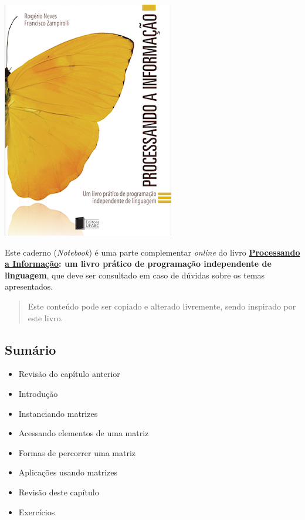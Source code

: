 \documentclass[12pt,a4paper]{article}
\providecommand{\tightlist}{%
      \setlength{\itemsep}{0pt}\setlength{\parskip}{0pt}}
\begin{document}
    \includegraphics{"figs/Capa_Processando_Informacao.jpg"}

Este caderno (\emph{Notebook}) é uma parte complementar \emph{online} do
livro
\textbf{\href{https://editora.ufabc.edu.br/matematica-e-ciencias-da-computacao/58-processando-a-informacao}{Processando
a Informação}: um livro prático de programação independente de
linguagem}, que deve ser consultado em caso de dúvidas sobre os temas
apresentados.

\begin{quote}
Este conteúdo pode ser copiado e alterado livremente, sendo inspirado
por este livro.
\end{quote}

    \hypertarget{sumuxe1rio}{%
\subsection{Sumário}\label{sumuxe1rio}}

\begin{itemize}
\tightlist
\item
  Revisão do capítulo anterior
\item
  Introdução
\item
  Instanciando matrizes
\item
  Acessando elementos de uma matriz
\item
  Formas de percorrer uma matriz
\item
  Aplicações usando matrizes
\item
  Revisão deste capítulo
\item
  Exercícios
\end{itemize}
\end{document}
